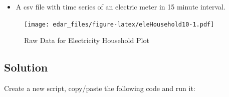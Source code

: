 \documentclass[
]{book}
\providecommand{\tightlist}{%
  \setlength{\itemsep}{0pt}\setlength{\parskip}{0pt}}
\begin{document}
\begin{itemize}
\tightlist
\item
  A csv file with time series of an electric meter in 15 minute interval.
\end{itemize}

\begin{figure}
\centering
\texttt{[image: edar\_files/figure-latex/eleHousehold10-1.pdf]}
\caption{\label{fig:eleHousehold10}Raw Data for Electricity Household Plot}
\end{figure}

\hypertarget{solution-14}{%
\subsection{Solution}\label{solution-14}}

Create a new script, copy/paste the following code and run it:
\end{document}
